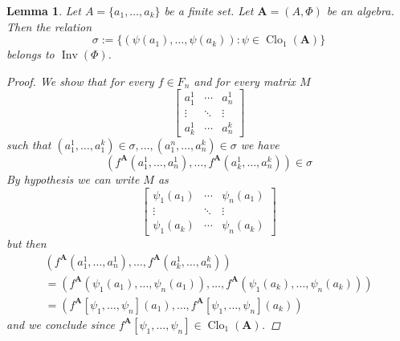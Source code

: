\documentclass{amsart}
\theoremstyle{plain}
\newtheorem{lemma}[theorem]{Lemma}
\theoremstyle{definition}
\theoremstyle{remark}
\DeclareMathOperator{\Clo}{Clo}
\DeclareMathOperator{\Inv}{Inv}
\begin{document}
\begin{lemma}
    \label{clo1_group}
    Let $A=\{a_1, \ldots, a_k\}$ be a finite set. 
    Let $\mathbf{A}=(A, \Phi)$ be an algebra. 
    Then the relation 
    \begin{equation}
        \sigma:=\{(\psi(a_1), \ldots, \psi(a_k)) : \psi \in \Clo_1(\mathbf{A})\}
    \end{equation}
    belongs to $\Inv(\Phi)$. 
    \begin{proof}
        We show that for every $f \in F_n$ and for every matrix $M$
        \begin{equation*}
            \begin{bmatrix}
              a_1^1 & \cdots & a^1_n \\
              \vdots & \ddots &  \vdots  \\
              a_k^1 & \cdots & a^k_n
              \end{bmatrix}
          \end{equation*}
          such that $(a_1^1, \ldots, a^k_1) \in \sigma, \ldots, (a_1^n, \ldots, a^k_n) \in \sigma$ we have 
          \begin{equation*}
            (f^{\mathbf{A}}(a_1^1, \ldots, a^1_n), \ldots,f^{\mathbf{A}}(a_k^1, \ldots, a^k_n)) \in \sigma
          \end{equation*} 
          By hypothesis we can write $M$ as 
          \begin{equation*}
            \begin{bmatrix}
              \psi_1(a_1) & \cdots & \psi_n(a_1) \\
              \vdots & \ddots &  \vdots  \\
              \psi_1(a_k) & \cdots & \psi_n(a_k)
              \end{bmatrix}
          \end{equation*}
          but then 
        \begin{multline*}
            (f^{\mathbf{A}}(a_1^1, \ldots, a^1_n), \ldots,f^{\mathbf{A}}(a_k^1, \ldots, a^k_n))\\
             = (f^{\mathbf{A}}(\psi_1(a_1), \ldots, \psi_n(a_1)), \ldots,f^{\mathbf{A}}(\psi_1(a_k), \ldots, \psi_n(a_k))) \\
             = (f^{\mathbf{A}}[\psi_1, \ldots, \psi_n](a_1), \ldots, f^{\mathbf{A}}[\psi_1, \ldots, \psi_n](a_k))
        \end{multline*}
        and we conclude since $f^{\mathbf{A}}[\psi_1, \ldots, \psi_n] \in \Clo_1(\mathbf{A})$. 
    \end{proof}
\end{lemma}
\end{document}
